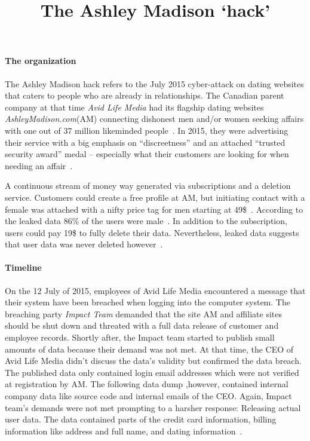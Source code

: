 \documentclass{homework}
\title{The Ashley Madison ‘hack’ }
\begin{document}
 \maketitle

\paragraph{\textbf{The organization}}The Ashley Madison hack refers to the July 2015 cyber-attack on dating websites that caters to people who are already in relationships. The Canadian parent company at that time \emph{Avid Life Media} had its flagship dating websites \emph{AshleyMadison.com}(AM) connecting dishonest men and/or women seeking affairs with one out of 37 million likeminded people~\cite{paper}. In 2015, they were advertising their service with a big emphasis on “discreetness” and an attached “trusted security award” medal – especially what their customers are looking for when needing an affair~\cite{wayback}.

A continuous stream of money way generated via subscriptions and a deletion service. Customers could create a free profile at AM, but initiating contact with a female was attached with a nifty price tag for men starting at 49\$~\cite{sub}. According to the leaked data 86\% of the users were male~\cite{paper}. In addition to the subscription, users could pay 19\$ to fully delete their data. Nevertheless, leaked data suggests that user data was never deleted however~\cite{paper}.

\paragraph{\textbf{Timeline}}On the 12 July of 2015, employees of Avid Life Media encountered a message that their system have been breached when logging into the computer system. The breaching party \emph{Impact Team} demanded that the site AM and affiliate sites should be shut down and threated with a full data release of customer and employee records. Shortly after, the Impact team started to publish small amounts of data because their demand was not met. At that time, the CEO of Avid Life Media didn’t discuss the data’s validity but confirmed the data breach. The published data only contained login email addresses which were not verified at registration by AM. The following data dump ,however, contained internal company data like source code and internal emails of the CEO. Again, Impact team's demands were not met prompting to a harsher response: Releasing actual user data. The data contained parts of the credit card information, billing information like address and full name, and dating information~\cite{erratasec}.
\end{document}

